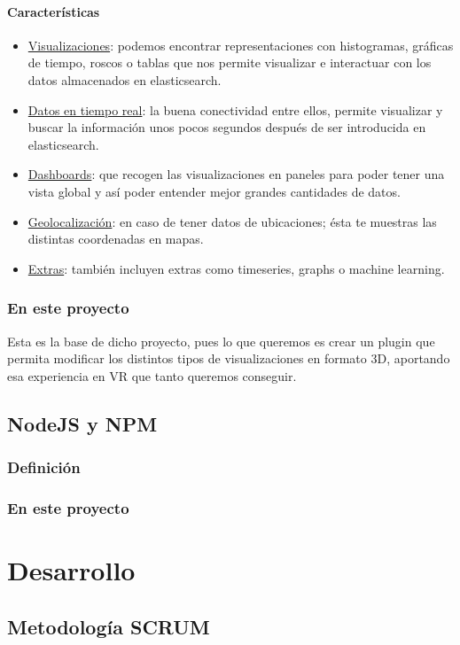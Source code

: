 \documentclass[a4paper, 12pt]{book}
\begin{document}
\subsubsection{Caracter\'isticas}
\begin{itemize}
\item \underline{Visualizaciones}: podemos encontrar representaciones con histogramas, gr\'aficas de tiempo, roscos o tablas que nos permite visualizar e interactuar con los datos almacenados en elasticsearch.
\item \underline{Datos en tiempo real}: la buena conectividad entre ellos, permite visualizar y buscar la informaci\'on unos pocos segundos despu\'es de ser introducida en elasticsearch.
\item \underline{Dashboards}: que recogen las visualizaciones en paneles para poder tener una vista global y as\'i poder entender mejor grandes cantidades de datos.
\item \underline{Geolocalizaci\'on}: en caso de tener datos de ubicaciones; \'esta te muestras las distintas coordenadas en mapas.
\item \underline{Extras}: tambi\'en incluyen extras como timeseries, graphs o machine learning.
\end{itemize}
\subsection{En este proyecto}
Esta es la base de dicho proyecto, pues lo que queremos es crear un plugin que permita modificar los distintos tipos de visualizaciones en formato 3D, aportando esa experiencia en VR que tanto queremos conseguir.



\section{NodeJS y NPM}
\label{sec:nodejs}
\subsection{Definici\'on}
\subsection{En este proyecto}


\cleardoublepage
\chapter{Desarrollo}
\label{sec:desarrollo} 


\section{Metodolog\'ia SCRUM}
\label{sec:scrum}

\end{document}
